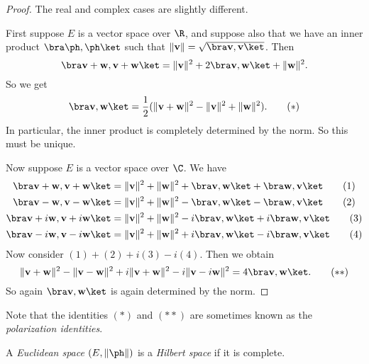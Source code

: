 \documentclass[a4paper]{article}
\begin{document}
\begin{proof}
  The real and complex cases are slightly different.

  First suppose $E$ is a vector space over $\R$, and suppose also that we have an inner product $\bra \ph,\ph\ket$ such that $\|\mathbf{v}\| = \sqrt{\bra \mathbf{v}, \mathbf{v}\ket }$. Then
  \[
    \bra \mathbf{v} + \mathbf{w}, \mathbf{v} + \mathbf{w}\ket = \|\mathbf{v}\|^2 + 2\bra \mathbf{v}, \mathbf{w}\ket + \|\mathbf{w}\|^2.
  \]
  So we get
  \[
    \bra \mathbf{v}, \mathbf{w}\ket = \frac{1}{2} (\|\mathbf{v} + \mathbf{w}\|^2 - \|\mathbf{v}\|^2 + \|\mathbf{w}\|^2).\tag{$*$}
  \]
  In particular, the inner product is completely determined by the norm. So this must be unique.

  Now suppose $E$ is a vector space over $\C$. We have
  \begin{align*}
    \bra \mathbf{v} + \mathbf{w}, \mathbf{v} + \mathbf{w}\ket &= \|\mathbf{v}\|^2 + \|\mathbf{w}\|^2 + \bra \mathbf{v}, \mathbf{w}\ket + \bra \mathbf{w}, \mathbf{v}\ket\tag{1}\\
    \bra \mathbf{v} - \mathbf{w}, \mathbf{v} - \mathbf{w}\ket &= \|\mathbf{v}\|^2 + \|\mathbf{w}\|^2 - \bra \mathbf{v}, \mathbf{w}\ket - \bra \mathbf{w}, \mathbf{v}\ket\tag{2}\\
    \bra \mathbf{v} +i\mathbf{w}, \mathbf{v} +i\mathbf{w}\ket &= \|\mathbf{v}\|^2 + \|\mathbf{w}\|^2 -i\bra \mathbf{v}, \mathbf{w}\ket +i\bra \mathbf{w}, \mathbf{v}\ket\tag{3}\\
    \bra \mathbf{v} -i\mathbf{w}, \mathbf{v} -i\mathbf{w}\ket &= \|\mathbf{v}\|^2 + \|\mathbf{w}\|^2 +i\bra \mathbf{v}, \mathbf{w}\ket -i\bra \mathbf{w}, \mathbf{v}\ket\tag{4}
  \end{align*}
  Now consider $(1) + (2) + i(3) - i(4)$. Then we obtain
  \[
    \|\mathbf{v} + \mathbf{w}\|^2 - \|\mathbf{v} - \mathbf{w}\|^2 + i\|\mathbf{v} + \mathbf{w}\|^2 - i\|\mathbf{v} - i\mathbf{w}\|^2 = 4\bra \mathbf{v}, \mathbf{w}\ket.\tag{$**$}
  \]
  So again $\bra \mathbf{v}, \mathbf{w}\ket$ is again determined by the norm.
\end{proof}
Note that the identities $(*)$ and $(**)$ are sometimes known as the \emph{polarization identities}.

\begin{defi}
  A \emph{Euclidean space} $(E, \|\ph\|)$ is a \emph{Hilbert space} if it is complete.
\end{defi}
\end{document}
